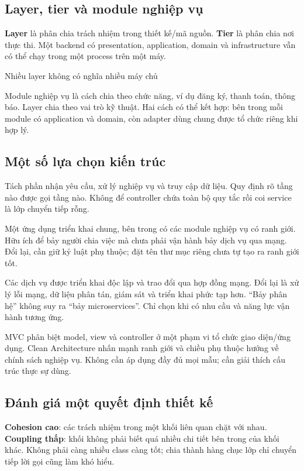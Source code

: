 \subsection{Layer, tier và module nghiệp vụ}
\textbf{Layer} là phân chia trách nhiệm trong thiết kế/mã nguồn. \textbf{Tier} là phân chia nơi thực thi. Một backend có presentation, application, domain và infrastructure vẫn có thể chạy trong một process trên một máy.

  {Nhiều layer không có nghĩa nhiều máy chủ}

Module nghiệp vụ là cách chia theo chức năng, ví dụ đăng ký, thanh toán, thông báo. Layer chia theo vai trò kỹ thuật. Hai cách có thể kết hợp: bên trong mỗi module có application và domain, còn adapter dùng chung được tổ chức riêng khi hợp lý.

\subsection{Một số lựa chọn kiến trúc}
Tách phần nhận yêu cầu, xử lý nghiệp vụ và truy cập dữ liệu. Quy định rõ tầng nào được gọi tầng nào. Không để controller chứa toàn bộ quy tắc rồi coi service là lớp chuyển tiếp rỗng.

Một ứng dụng triển khai chung, bên trong có các module nghiệp vụ có ranh giới. Hữu ích để bảy người chia việc mà chưa phải vận hành bảy dịch vụ qua mạng. Đổi lại, cần giữ kỷ luật phụ thuộc; đặt tên thư mục riêng chưa tự tạo ra ranh giới tốt.

Các dịch vụ được triển khai độc lập và trao đổi qua hợp đồng mạng. Đổi lại là xử lý lỗi mạng, dữ liệu phân tán, giám sát và triển khai phức tạp hơn. ``Bảy phân hệ'' không suy ra ``bảy microservices''. Chỉ chọn khi có nhu cầu và năng lực vận hành tương ứng.

MVC phân biệt model, view và controller ở một phạm vi tổ chức giao diện/ứng dụng. Clean Architecture nhấn mạnh ranh giới và chiều phụ thuộc hướng về chính sách nghiệp vụ. Không cần áp dụng đầy đủ mọi mẫu; cần giải thích cấu trúc thực sự dùng.

\subsection{Đánh giá một quyết định thiết kế}
\textbf{Cohesion cao}: các trách nhiệm trong một khối liên quan chặt với nhau. \textbf{Coupling thấp}: khối không phải biết quá nhiều chi tiết bên trong của khối khác. Không phải càng nhiều class càng tốt; chia thành hàng chục lớp chỉ chuyển tiếp lời gọi cũng làm khó hiểu.

